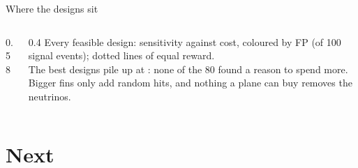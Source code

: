 \documentclass[aspectratio=169,10pt]{beamer}
\begin{document}
\begin{frame}{Where the designs sit}
  \begin{columns}[c]
    \begin{column}{0.58\textwidth}
    \end{column}
    \begin{column}{0.4\textwidth}\footnotesize
      Every feasible design: sensitivity against cost, coloured by FP (of 100 signal events); dotted lines of equal reward.\\[1.5mm]
      The best designs pile up at : none of the 80 found a reason to spend more. Bigger fins only add random hits, and nothing a plane can buy removes the neutrinos.\\[1.5mm]
    \end{column}
  \end{columns}
\end{frame}



\section{Next}
\end{document}
